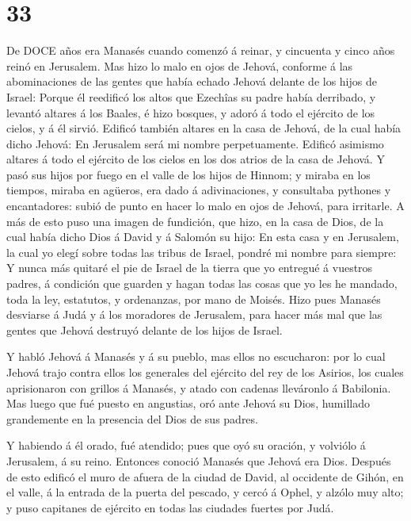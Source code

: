 \hypertarget{section-32}{%
\section{33}\label{section-32}}

 De DOCE años era Manasés cuando comenzó á reinar, y
cincuenta y cinco años reinó en Jerusalem.  Mas hizo lo malo
en ojos de Jehová, conforme á las abominaciones de las gentes que había
echado Jehová delante de los hijos de Israel:  Porque él
reedificó los altos que Ezechîas su padre había derribado, y levantó
altares á los Baales, é hizo bosques, y adoró á todo el ejército de los
cielos, y á él sirvió.  Edificó también altares en la casa
de Jehová, de la cual había dicho Jehová: En Jerusalem será mi nombre
perpetuamente.  Edificó asimismo altares á todo el ejército
de los cielos en los dos atrios de la casa de Jehová.  Y
pasó sus hijos por fuego en el valle de los hijos de Hinnom; y miraba en
los tiempos, miraba en agüeros, era dado á adivinaciones, y consultaba
pythones y encantadores: subió de punto en hacer lo malo en ojos de
Jehová, para irritarle.  A más de esto puso una imagen de
fundición, que hizo, en la casa de Dios, de la cual había dicho Dios á
David y á Salomón su hijo: En esta casa y en Jerusalem, la cual yo elegí
sobre todas las tribus de Israel, pondré mi nombre para siempre:
 Y nunca más quitaré el pie de Israel de la tierra que yo
entregué á vuestros padres, á condición que guarden y hagan todas las
cosas que yo les he mandado, toda la ley, estatutos, y ordenanzas, por
mano de Moisés.  Hizo pues Manasés desviarse á Judá y á los
moradores de Jerusalem, para hacer más mal que las gentes que Jehová
destruyó delante de los hijos de Israel.

 Y habló Jehová á Manasés y á su pueblo, mas ellos no
escucharon: por lo cual Jehová trajo contra ellos los generales del
ejército del rey de los Asirios, los cuales aprisionaron con grillos á
Manasés, y atado con cadenas lleváronlo á Babilonia.  Mas
luego que fué puesto en angustias, oró ante Jehová su Dios, humillado
grandemente en la presencia del Dios de sus padres.

 Y habiendo á él orado, fué atendido; pues que oyó su
oración, y volviólo á Jerusalem, á su reino. Entonces conoció Manasés
que Jehová era Dios.  Después de esto edificó el muro de
afuera de la ciudad de David, al occidente de Gihón, en el valle, á la
entrada de la puerta del pescado, y cercó á Ophel, y alzólo muy alto; y
puso capitanes de ejército en todas las ciudades fuertes por Judá.

